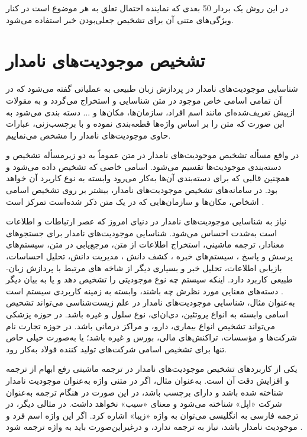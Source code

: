 در این روش یک بردار 50 بعدی که نماینده احتمال تعلق به هر موضوع است در کنار ویژگی‌های متنی آن برای تشخیص جعلی‌بودن خبر استفاده می‌شود.

\section{تشخیص موجودیت‌های نامدار}
شناسایی موجودیت­‌های نامدار در پردازش زبان طبیعی به عملیاتی گفته می‌­شود که در آن تمامی­ اسامی خاص موجود در متن شناسایی و استخراج می‌گردد و به مقولات ازپیش ‌تعریف‌شده‌ای مانند اسم افراد، سازمان‌ها، مکان‌ها و ... دسته بندی می‌شود به این صورت که متن را بر اساس واژه‌ها قطعه‌بندی نموده و با برچسب‌زنی، عبارات حاوی موجودیت‌های نامدار را مشخص می‌نماییم.

در واقع مسأله تشخیص موجودیت‌های نامدار در متن عموماً به دو زیر‌مسأله تشخیص و دسته‌بندی موجودیت‌ها تقسیم می‌شود. اسامی خاصی که تشخیص داده می‌شود و همچنین قالبی که برای دسته‌بندی آن‌ها به‌کار می‌رود وابسته به نوع کاربرد آن خواهد‌ بود. در سامانه‌های تشخیص موجودیت‌های نامدار، بیشتر بر روی تشخیص اسامی اشخاص، مکان‌­ها و سازمان‌هایی که در یک متن ذکر شده‌است تمرکز است \citep{chen2015}.

نیاز به شناسایی موجودیت­‌های نامدار در دنیای امروز که عصر ارتباطات و اطلاعات است به‌شدت احساس می‌­شود. شناسایی موجودیت‌­های نامدار برای جستجوهای معنادار، ترجمه ماشینی، استخراج اطلاعات از متن، مرجع‌یابی در متن، سیستم­‌های پرسش و پاسخ ، سیستم‌های خبره ، کشف دانش ، مدیریت دانش، تحلیل احساسات، بازیابی اطلاعات، تحلیل خبر و بسیاری دیگر از شاخه های مرتبط با پردازش زبان­ طبیعی کاربرد دارد. اینکه سیستم چه نوع موجودیتی را تشخیص دهد و یا به بیان دیگر دسته‌های معنایی مورد نظرش چه باشند، وابسته به زمینه کاربردی سیستم است \citep{ABDALLAH201734}.\\
به‌عنوان مثال، شناسایی موجودیت‌های نامدار در علم زیست‌شناسی می‌­تواند تشخیص اسامی وابسته به انواع پروتئین­، دی‌ان‌­ای، نوع سلول و غیره باشد. در حوزه پزشکی می‌تواند تشخیص انواع بیماری، دارو، و مراکز درمانی باشد. در حوزه تجارت نام شرکت‌­ها و مؤسسات، تراکنش­‌های مالی، بورس و غیره باشد؛ یا به‌صورت خیلی خاص  تنها برای تشخیص اسامی شرکت­‌های تولید کننده فولاد به‌کار رود.

یکی از کاربردهای تشخیص موجودیت‌­های نامدار در ترجمه ماشینی رفع ابهام از ترجمه و افزایش دقت آن است. به‌عنوان مثال، اگر در متنی واژه  به‌عنوان موجودیت نامدار شناخته شده باشد و دارای برچسب باشد، در این صورت در هنگام ترجمه به‌عنوان شرکت «اپل» شناخته می‌­شود و معنای «سیب» نخواهد داشت. در مثالی دیگر، در ترجمه فارسی به انگلیسی می‌­توان به واژه «زیبا» اشاره کرد. اگر این واژه اسم فرد و موجودیت نامدار باشد، نیاز به ترجمه ندارد، و درغیراین‌­صورت باید به واژه  ترجمه شود \citep{Hussain2016}.


